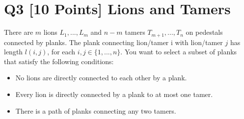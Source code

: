 \documentclass[10pt]{article}
\begin{document}
\section*{Q3 [10 Points] Lions and Tamers}
There are $m$ lions $L_1,...,L_m$ and $n−m$ tamers $T_{m+1},...,T_n$ on pedestals connected by planks. The plank connecting lion/tamer i with lion/tamer $j$ has length $l(i, j)$, for each $i, j \in \{1, . . . , n\}$. You want to select a subset of planks that satisfy the following conditions:
\begin{itemize}
    \item No lions are directly connected to each other by a plank.
    \item Every lion is directly connected by a plank to at most one tamer.
    \item There is a path of planks connecting any two tamers.
\end{itemize}
\end{document}
